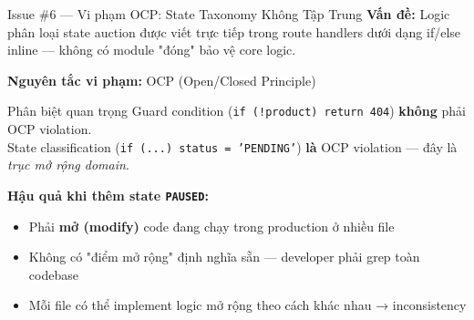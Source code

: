\documentclass[12pt]{beamer}
\begin{document}
\begin{frame}{Issue \#6 — Vi phạm OCP: State Taxonomy Không Tập Trung}
  \textbf{Vấn đề:} Logic phân loại state auction được viết trực tiếp trong route handlers dưới dạng if/else inline — không có module "đóng" bảo vệ core logic.

  \bigskip
  \textbf{Nguyên tắc vi phạm:} \alert{OCP} (Open/Closed Principle)

  \bigskip
  \begin{alertblock}{Phân biệt quan trọng}
    Guard condition (\texttt{if (!product) return 404}) \textbf{không} phải OCP violation.\\
    State classification (\texttt{if (...) status = 'PENDING'}) \textbf{là} OCP violation — đây là \emph{trục mở rộng domain}.
  \end{alertblock}

  \bigskip
  \textbf{Hậu quả khi thêm state \texttt{PAUSED}:}
  \begin{itemize}
    \item Phải \textbf{mở (modify)} code đang chạy trong production ở nhiều file
    \item Không có "điểm mở rộng" định nghĩa sẵn — developer phải grep toàn codebase
    \item Mỗi file có thể implement logic mở rộng theo cách khác nhau → inconsistency
  \end{itemize}
\end{frame}
\end{document}
